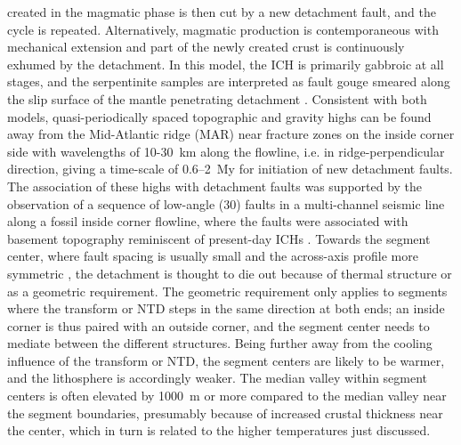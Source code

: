\documentclass[jgr]{aguplus}
\newlength{\tw}
\begin{document}
\begin{article}
created in the magmatic phase is then cut by a new detachment fault,
and the cycle is repeated.  Alternatively,
magmatic production is contemporaneous with mechanical extension and part
of the newly created crust is continuously exhumed by the
detachment. In this model, the ICH is primarily gabbroic at all
stages, and the serpentinite samples are interpreted as fault gouge
smeared along the slip surface of the mantle penetrating detachment \citep{reston02}.
Consistent with both models, quasi-periodically spaced topographic and
gravity highs can be
found away from the Mid-Atlantic ridge  (MAR) near fracture zones on the
inside corner side with wavelengths of 10-30~km along the flowline, i.e. in
ridge-perpendicular direction, giving a time-scale of 0.6--2~My for initiation of new detachment faults.  The
association of these highs with detachment faults was supported by the
observation of a sequence of low-angle (30\dg) faults in a multi-channel seismic
line along a fossil inside corner flowline, where the faults were
associated with basement topography reminiscent of
present-day ICHs \citep{ranero99}.
Towards the segment center, where fault spacing is usually small and
the across-axis profile more symmetric \citep{shaw93}, the
detachment is thought to die out because of thermal structure or as a
geometric requirement.  The geometric requirement only applies to
segments where the transform or NTD steps in the same direction at
both ends; an inside corner is thus paired with an outside corner, and
the segment center needs to mediate between the different structures.
Being further away from the cooling influence of the transform or NTD,
the segment centers are likely to be warmer, and the lithosphere is
accordingly weaker.  The median valley within segment centers is often
elevated by 1000~m or more compared to the median valley near the
segment boundaries, presumably because of increased
crustal thickness near the center,
which in turn is related to the  higher temperatures just discussed.


\end{article}
\end{document}
